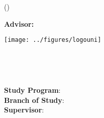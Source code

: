 \ifx\draft\undefined
\thispagestyle{empty}
\noindent
	\begin{center}
		\sc \mfuniversity \\
		\mffaculty \\
		\mfdepartment  
	\end{center}
\vfill
\begin{center}
	\begin{minipage}{0.8\textwidth}
		\bigskip\bigskip
		\centerline{\LARGE\sc\mftitlea}
		\centerline{\LARGE\sc\mftitleb}
		\smallskip
		\centerline{(\mfthesistype)}
		\bigskip
		\bigskip
		\centerline{\large\sc\mfauthor}
		\bigskip\bigskip
	\end{minipage}
\end{center}
\afterpage{\blankpage}
\vfill
{\bf Advisor:} \mfadvisor
\hfill\mfplacedate
\pagebreak
\fi

\ifx\draft\undefined
\thispagestyle{empty}
\begin{minipage}{0.20\textwidth}
	\texttt{[image: ../figures/logouni]}
\end{minipage}
\begin{minipage}{0.79\textwidth}
\begin{center}
  \Large \sc \mfuniversity \\
  \mffaculty 
\end{center}
\end{minipage}
\vspace{7cm}
\begin{center}
  {\Huge \mftitle}\\
  \large \mfthesistype
\end{center}
\vspace{7cm}

\noindent
{\bf Study Program}: \mfstudyprogram\\
{\bf Branch of Study}: \mfbranchofstudy\\
{\bf Supervisor}: \mfadvisor

